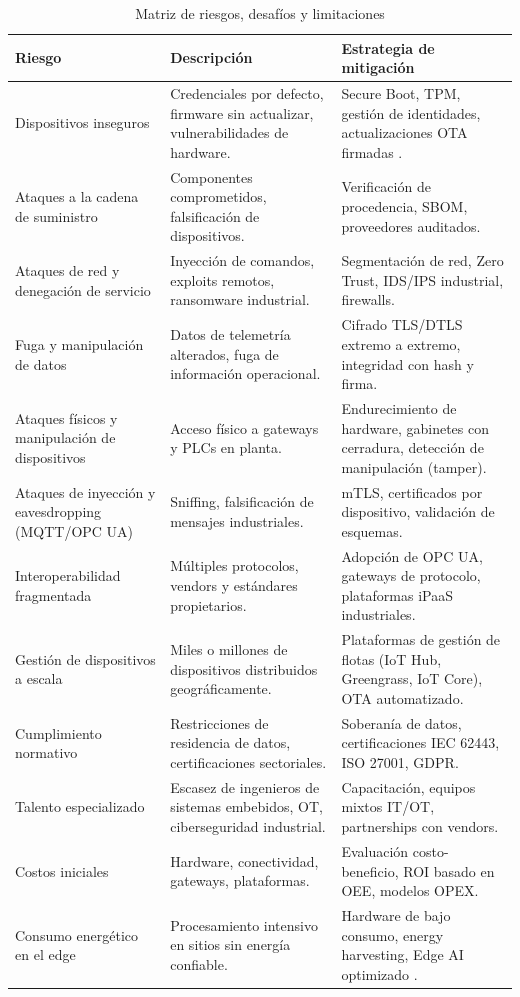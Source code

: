 ﻿\documentclass[12pt,a4paper,oneside]{article}
\begin{document}
\begin{table}[h!]
\centering
\caption{Matriz de riesgos, desafíos y limitaciones}
\label{tab:riesgos}
\begin{tabular}{p{3.5cm} p{4.5cm} p{6.5cm}}
\toprule
\textbf{Riesgo} & \textbf{Descripción} & \textbf{Estrategia de mitigación} \\
\midrule
Dispositivos inseguros & Credenciales por defecto, firmware sin actualizar, vulnerabilidades de hardware. & Secure Boot, TPM, gestión de identidades, actualizaciones OTA firmadas \cite{nistIR8259}. \\
Ataques a la cadena de suministro & Componentes comprometidos, falsificación de dispositivos. & Verificación de procedencia, SBOM, proveedores auditados. \\
Ataques de red y denegación de servicio & Inyección de comandos, exploits remotos, ransomware industrial. & Segmentación de red, Zero Trust, IDS/IPS industrial, firewalls. \\
Fuga y manipulación de datos & Datos de telemetría alterados, fuga de información operacional. & Cifrado TLS/DTLS extremo a extremo, integridad con hash y firma. \\
Ataques físicos y manipulación de dispositivos & Acceso físico a gateways y PLCs en planta. & Endurecimiento de hardware, gabinetes con cerradura, detección de manipulación (tamper). \\
Ataques de inyección y eavesdropping (MQTT/OPC UA) & Sniffing, falsificación de mensajes industriales. & mTLS, certificados por dispositivo, validación de esquemas. \\
Interoperabilidad fragmentada & Múltiples protocolos, vendors y estándares propietarios. & Adopción de OPC UA, gateways de protocolo, plataformas iPaaS industriales. \\
Gestión de dispositivos a escala & Miles o millones de dispositivos distribuidos geográficamente. & Plataformas de gestión de flotas (IoT Hub, Greengrass, IoT Core), OTA automatizado. \\
Cumplimiento normativo & Restricciones de residencia de datos, certificaciones sectoriales. & Soberanía de datos, certificaciones IEC 62443, ISO 27001, GDPR. \\
Talento especializado & Escasez de ingenieros de sistemas embebidos, OT, ciberseguridad industrial. & Capacitación, equipos mixtos IT/OT, partnerships con vendors. \\
Costos iniciales & Hardware, conectividad, gateways, plataformas. & Evaluación costo-beneficio, ROI basado en OEE, modelos OPEX. \\
Consumo energético en el edge & Procesamiento intensivo en sitios sin energía confiable. & Hardware de bajo consumo, energy harvesting, Edge AI optimizado \cite{sustainabilityEdge}. \\
\bottomrule
\end{tabular}
\end{table}
\end{document}
